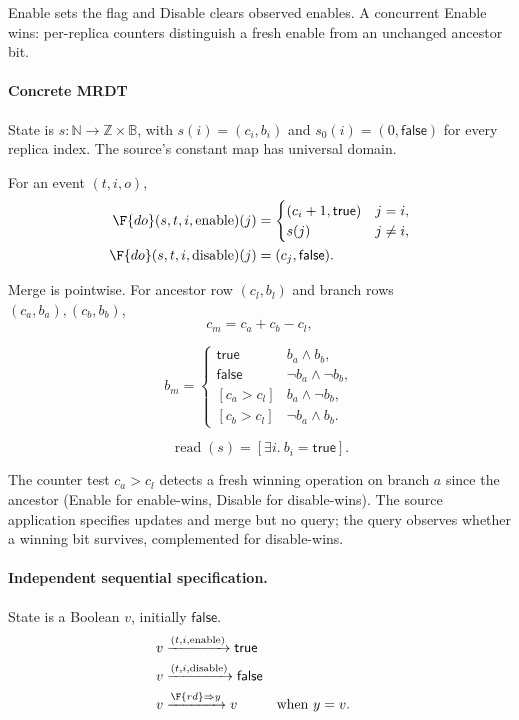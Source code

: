 
Enable sets the flag and Disable clears observed enables. A concurrent Enable wins: per-replica counters distinguish a fresh enable from an unchanged ancestor bit.

\paragraph{Concrete MRDT}
State is $s:\mathbb N\to\mathbb Z\times\mathbb B$, with $s(i)=(c_i,b_i)$ and $s_0(i)=(0,\mathsf{false})$ for every replica index. The source's constant map has universal domain.

For an event $(t,i,o)$,
\[
\begin{aligned}
\F{do}(s,t,i,\mathrm{enable})(j)&=\begin{cases}(c_i+1,\mathsf{true})&j=i,\\s(j)&j\ne i,\end{cases}\\
\F{do}(s,t,i,\mathrm{disable})(j)&=(c_j,\mathsf{false}).
\end{aligned}
\]


Merge is pointwise. For ancestor row $(c_l,b_l)$ and branch rows $(c_a,b_a),(c_b,b_b)$,
\[
c_m=c_a+c_b-c_l,
\]

\[
b_m=\begin{cases}
\mathsf{true}&b_a\land b_b,\\
\mathsf{false}&\neg b_a\land\neg b_b,\\
[c_a>c_l]&b_a\land\neg b_b,\\
[c_b>c_l]&\neg b_a\land b_b.
\end{cases}
\]

\[
\operatorname{read}(s)=[\exists i.\ b_i=\mathsf{true}].
\]

The counter test $c_a>c_l$ detects a fresh winning operation on branch $a$
since the ancestor (Enable for enable-wins, Disable for disable-wins). The
source application specifies updates and merge but no query; the query
observes whether a winning bit survives, complemented for disable-wins.


\paragraph{Independent sequential specification.}
State is a Boolean $v$, initially $\mathsf{false}$.
\[
\begin{aligned}
v&\xrightarrow{(t,i,\mathrm{enable})}\mathsf{true}\\
v&\xrightarrow{(t,i,\mathrm{disable})}\mathsf{false}\\
v&\xrightarrow{\F{rd}\Rightarrow y}v&&\text{when }y=v.
\end{aligned}
\]

